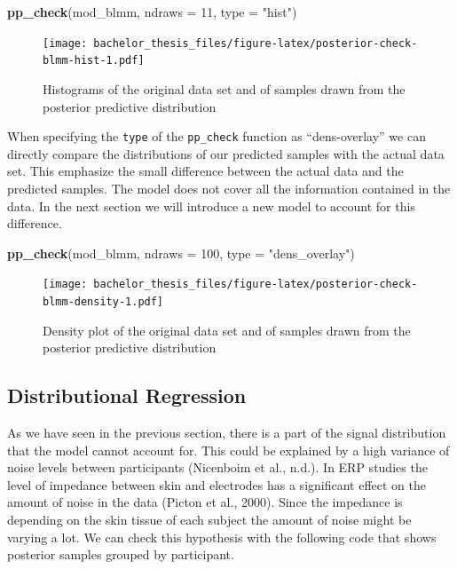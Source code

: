 \documentclass[
  doc,12pt,floatsintext]{apa7}
\newenvironment{Shaded}{\begin{snugshade}}{\end{snugshade}}
\newcommand{\AttributeTok}[1]{\textcolor[rgb]{0.13,0.29,0.53}{#1}}
\newcommand{\DecValTok}[1]{\textcolor[rgb]{0.00,0.00,0.81}{#1}}
\newcommand{\FunctionTok}[1]{\textcolor[rgb]{0.13,0.29,0.53}{\textbf{#1}}}
\newcommand{\NormalTok}[1]{#1}
\newcommand{\StringTok}[1]{\textcolor[rgb]{0.31,0.60,0.02}{#1}}
\begin{document}
\begin{Shaded}
\begin{Highlighting}[]
\FunctionTok{pp\_check}\NormalTok{(mod\_blmm, }\AttributeTok{ndraws =} \DecValTok{11}\NormalTok{, }\AttributeTok{type =} \StringTok{"hist"}\NormalTok{)}
\end{Highlighting}
\end{Shaded}

\begin{figure}
\centering
\texttt{[image: bachelor\_thesis\_files/figure-latex/posterior-check-blmm-hist-1.pdf]}
\caption{\label{fig:posterior-check-blmm-hist}Histograms of the original data set and of samples drawn from the posterior predictive distribution}
\end{figure}

When specifying the \texttt{type} of the \texttt{pp\_check} function as ``dens-overlay'' we can directly compare the distributions of our predicted samples with the actual data set. This emphasize the small difference between the actual data and the predicted samples. The model does not cover all the information contained in the data. In the next section we will introduce a new model to account for this difference.



\begin{Shaded}
\begin{Highlighting}[]
\FunctionTok{pp\_check}\NormalTok{(mod\_blmm, }\AttributeTok{ndraws =} \DecValTok{100}\NormalTok{, }\AttributeTok{type =} \StringTok{"dens\_overlay"}\NormalTok{)}
\end{Highlighting}
\end{Shaded}

\begin{figure}
\centering
\texttt{[image: bachelor\_thesis\_files/figure-latex/posterior-check-blmm-density-1.pdf]}
\caption{\label{fig:posterior-check-blmm-density}Density plot of the original data set and of samples drawn from the posterior predictive distribution}
\end{figure}

\subsection{Distributional Regression}\label{distributional-regression}

As we have seen in the previous section, there is a part of the signal distribution that the model cannot account for. This could be explained by a high variance of noise levels between participants (Nicenboim et al., n.d.). In ERP studies the level of impedance between skin and electrodes has a significant effect on the amount of noise in the data (Picton et al., 2000). Since the impedance is depending on the skin tissue of each subject the amount of noise might be varying a lot. We can check this hypothesis with the following code that shows posterior samples grouped by participant.
\end{document}
